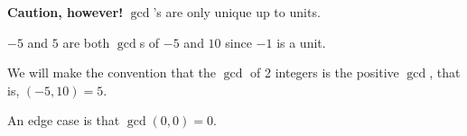 \textbf{Caution, however!} $\gcd$'s are only unique up to units.

\begin{example*}
    $-5$ and $5$ are both $\gcd$s of $-5$ and $10$ since $-1$ is a unit.
\end{example*}

We will make the convention that the $\gcd$ of 2 integers is the positive $\gcd$, that is, $(-5, 10) = 5$.

An edge case is that $\gcd(0, 0)=0$.
